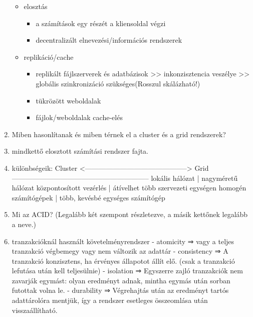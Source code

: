 \documentclass[twoside, a4paper, 12pt]{article}
\begin{document}
\begin{enumerate}
\begin{itemize}
\begin{itemize}
                \end{itemize}
                    \item elosztás 
                        \begin{itemize}
                            \item a számítások egy részét a kliensoldal végzi
                            \item decentralizált elnevezési/információs rendszerek
                        \end{itemize}
                    \item replikáció/cache
                        \begin{itemize}
                            \item replikált fájlszerverek és adatbázisok >> inkonzisztencia veszélye >>
                                globális szinkronizáció szükséges(Rosszul skálázható!)
                            \item tükrözött weboldalak
                            \item fájlok/weboldalak cache-elés
                        \end{itemize}
            \end{itemize}
            \item  Miben hasonlítanak és miben térnek el a cluster és a grid rendszerek?
            \item mindkettő elosztott számítási rendszer fajta.
            \item különbségeik:
                Cluster <--------------------------------------------> Grid
                -----------------------------------------------------------
                lokális hálózat	        | nagyméretű hálózat
                központosított vezérlés | átívelhet több szervezeti egységen
                homogén számítógépek	| több, kevésbé egységes számítógép
            \item  Mi az ACID? (Legalább két szempont részletezve, a másik kettőnek legalább a neve.)
            \item tranzakcióknál használt követelményrendszer
                - atomicity ⇒ vagy a teljes tranzakció végbemegy vagy nem változik az adattár
                - consistency ⇒ A tranzakció konzisztens, ha érvényes állapotot állít elő. (csak a tranzakció lefutása után kell teljesülnie)
                - isolation ⇒ Egyszerre zajló tranzakciók nem zavarják egymást: olyan eredményt adnak, mintha egymás után sorban futottak volna le.
                - durability ⇒ Végrehajtás után az eredményt tartós adattárolóra mentjük, így a rendszer esetleges összeomlása után visszaállítható.

\end{enumerate}
\end{document}
